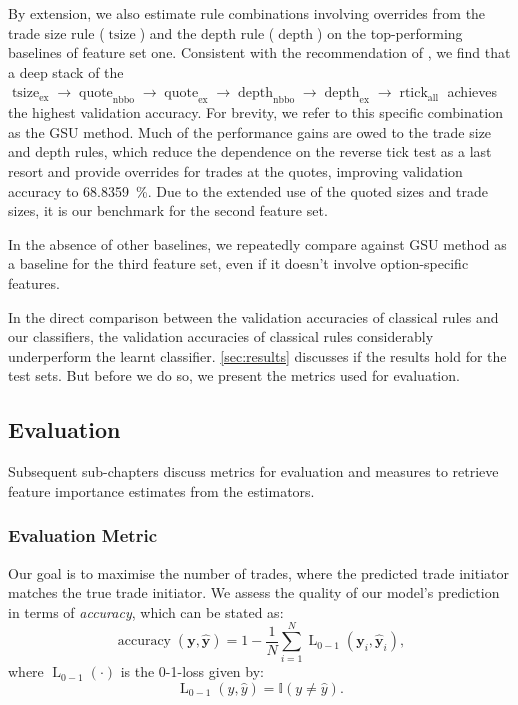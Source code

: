 By extension, we also estimate rule combinations involving overrides from the trade size rule ($\operatorname{tsize}$) and the depth rule ($\operatorname{depth}$) on the top-performing baselines of feature set one. Consistent with the recommendation of \textcite[][14]{grauerOptionTradeClassification2022}, we find that a deep stack of the $\operatorname{tsize}_{\mathrm{ex}} \to \operatorname{quote}_{\mathrm{nbbo}} \to \operatorname{quote}_{\mathrm{ex}} \to \operatorname{depth}_{\mathrm{nbbo}} \to \operatorname{depth}_{\mathrm{ex}} \to \operatorname{rtick}_{\mathrm{all}}$ achieves the highest validation accuracy. For brevity, we refer to this specific combination as the \gls{GSU} method. Much of the performance gains are owed to the trade size and depth rules, which reduce the dependence on the reverse tick test as a last resort and provide overrides for trades at the quotes, improving validation accuracy to \SI{68.8359}{\percent}. Due to the extended use of the quoted sizes and trade sizes, it is our benchmark for the second feature set.

In the absence of other baselines, we repeatedly compare against \gls{GSU} method as a baseline for the third feature set, even if it doesn't involve option-specific features.

In the direct comparison between the validation accuracies of classical rules and our classifiers, the validation accuracies of classical rules considerably underperform the learnt classifier. \cref{sec:results} discusses if the results hold for the test sets. But before we do so, we present the metrics used
for evaluation.

\subsection{Evaluation}\label{sec:evaluation}

Subsequent sub-chapters discuss metrics for evaluation and measures to retrieve feature importance estimates from the estimators.

\subsubsection{Evaluation Metric}\label{sec:evaluation-metric}

Our goal is to maximise the number of trades, where the predicted trade initiator matches the true trade initiator. We assess the quality of our model’s prediction in terms of \emph{accuracy}, which can be stated as:
\begin{equation}
    \operatorname{accuracy}(\mathbf{y}, \widehat{\mathbf{y}}) = 1 - \frac{1}{N}\sum_{i=1}^{N} \operatorname{L}_{\mathrm{0-1}}(\mathbf{y}_i, \widehat{\mathbf{y}}_i),
\end{equation}
where $\operatorname{L}_{\mathrm{0-1}}(\cdot)$ is the 0-1-loss given by:
\begin{equation}
    \operatorname{L}_{\mathrm{0-1}}(y, \hat{y}) = \mathbb{I}\left(y\neq \hat{y}\right).
\end{equation}

